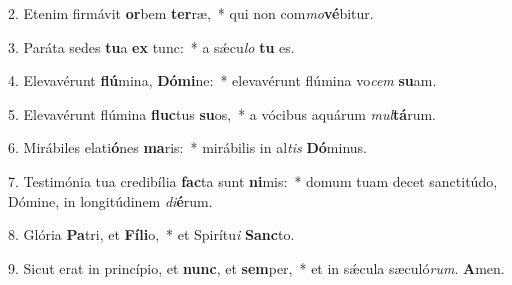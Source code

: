 2. Etenim firmávit \textbf{or}bem \textbf{ter}ræ,~*  qui non com\textit{mo}\textbf{vé}bitur.\

3. Paráta sedes \textbf{tu}a \textbf{ex} tunc:~*  a sǽcu\textit{lo} \textbf{tu} es.\

4. Elevavérunt \textbf{flú}mina, \textbf{Dó}\textbf{mi}ne:~*  elevavérunt flúmina vo\textit{cem} \textbf{su}am.\

5. Elevavérunt flúmina \textbf{fluc}tus \textbf{su}os,~*  a vócibus aquárum \textit{mul}\textbf{tá}rum.\

6. Mirábiles elati\textbf{ó}nes \textbf{ma}ris:~*  mirábilis in al\textit{tis} \textbf{Dó}minus.\

7. Testimónia tua credibília \textbf{fac}ta sunt \textbf{ni}mis:~*  domum tuam decet sanctitúdo, Dómine, in longitúdinem \textit{di}\textbf{é}rum.\

8. Glória \textbf{Pa}tri, et \textbf{Fí}\textbf{li}o,~*  et Spirítu\textit{i} \textbf{Sanc}to.\

9. Sicut erat in princípio, et \textbf{nunc}, et \textbf{sem}per,~*  et in sǽcula sæculó\textit{rum}. \textbf{A}men.\

